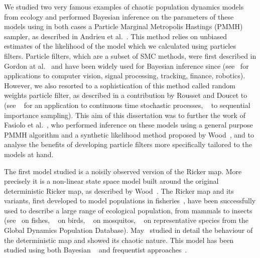 \documentclass[12pt]{article}
\begin{document}
	We studied two very famous examples of chaotic population dynamics models from ecology and performed Bayesian inference on the parameters of these models using in both cases a Particle Marginal Metropolis Hastings (PMMH) sampler, as described in Andrieu et al.~\cite{andrieu2010particle}. This method relies on unbiased estimates of the likelihood of the model which we calculated using particles filters. Particle filters, which are a subset of SMC methods, were first described in Gordon at al.~\cite{gordon1993novel} and have been widely used for Bayesian inference since (see~\cite{ristic2004beyond, cappe2006inference, smith2013sequential, liu2008monte} for applications to computer vision, signal processing, tracking, finance, robotics). However, we also resorted to a sophistication of this method called random weights particle filter, as described in a contribution by Rousset and Doucet to ~\cite{beskos2006exact} (see ~\cite{fearnhead2010random} for an application to continuous time stochastic processes, ~\cite{fearnhead2008particle} to sequential importance sampling). This aim of this dissertation was to further the work of Fasiolo et al.~\cite{fasiolo2014statistical}, who performed inference on these models using a general purpose PMMH algorithm and a synthetic likelihood method proposed by Wood~\cite{wood2010statistical}, and to analyse the benefits of developing particle filters more specifically tailored to the models at hand.
	
	The first model studied is a noisily observed version of the Ricker map. More precisely it is a non-linear state space model built around the original deterministic Ricker map, as described by Wood~\cite{wood2010statistical}. The Ricker map and its variants, first developed to model populations in fisheries~\cite{Ricker1954}, have been successfully used to describe a large range of ecological population, from mammals to insects (see~\cite{myers1999maximum, mueter2002opposite, krkovsek2007declining} on fishes, ~\cite{polansky2009likelihood, saether2002pattern} on birds, ~\cite{yang2008importance} on mosquitos, ~\cite{sibly2005regulation} on representative species from the Global Dynamics Population Database). May~\cite{may1975biological} studied in detail the behaviour of the deterministic map and showed its chaotic nature. This model has been studied using both Bayesian ~\cite{wood2010statistical, gao2012bayesian, fasiolo2014statistical} and frequentist approaches~\cite{sibly2005regulation, yang2008importance, polansky2009likelihood}.
	
\end{document}
